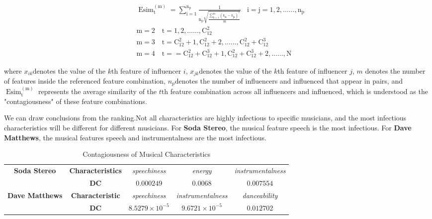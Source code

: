 \documentclass[12pt]{article}  %
\begin{document}
	\begin{equation}
		\begin{aligned}
			& \operatorname{Esim}_{\mathrm{t}}^{(\mathrm{m})}=\sum_{\mathrm{i}=1}^{\mathrm{n}_{\mathrm{p}}} \frac{1}{\mathrm{n}_{\mathrm{p}} \sqrt{\frac{\sum_{\mathrm{k}=1}^{\mathrm{m}}\left(\mathrm{x}_{\mathrm{ik}}-\mathrm{x}_{\mathrm{jk}}\right)^{2}}{\mathrm{~m}}}} 
			\mathrm{~~~~i}=\mathrm{j}=1,2, \ldots \ldots, \mathrm{n}_{\mathrm{p}} \\
			&\mathrm{m}=2 \quad \mathrm{t}=1,2, \ldots \ldots, \mathrm{C}_{12}^{2} \\
			&\mathrm{m}=3 \quad \mathrm{t}=\mathrm{C}_{12}^{2}+1, \mathrm{C}_{12}^{2}+2, \ldots \ldots, \mathrm{C}_{12}^{2}+\mathrm{C}_{12}^{3} \\
			&\mathrm{m}=4 \quad \mathrm{t}==\mathrm{C}_{12}^{2}+\mathrm{C}_{12}^{3}+1, \mathrm{C}_{12}^{2}+\mathrm{C}_{12}^{3}+2, \ldots \ldots, \mathrm{N}
		\end{aligned}
	\end{equation}
	
	where $ x_{ik} $denotes the value of the $ k $th feature of influencer $ i $, $ x_{jk} $denotes the value of the $ k $th feature of influencer $ j $, $ m $ denotes the number of features inside the referenced feature combination, $ n_p $denotes the number of influencers and influenced that appear in pairs, and $\operatorname{Esim}_{\mathrm{t}}^{(\mathrm{m})}$ represents the average similarity of the $ t $th feature combination across all influencers and influenced, which is understood as the "contagiousness" of these feature combinations.
	
	We can draw conclusions from the ranking.Not all characteristics are highly infectious to specific musicians, and the most infectious characteristics will be different for different musicians. For \textbf{Soda Stereo}, the musical feature speech is the most infectious. For \textbf{Dave Matthews}, the musical features speech and instrumentalness are the most infectious.
	
	\begin{table}[!htbp]
		\begin{center}
			\caption{Contagiousness of Musical Characteristics}
			\begin{tabular}{c|c|c|c|c}
				\toprule
				\midrule[1pt]
				\multirow{2}{*}{\textbf { Soda Stereo }} & \textbf { Characteristics } & \textit { speechiness } & \textit { energy } & \textit { instrumentalness } \\
				\cline { 2 - 5 } & \textbf{DC} & $ 0.000249 $ & $ 0.0068 $ & $ 0.007554 $ \\
				\hline \hline \multirow{2}{*}{\textbf { Dave Matthews }} & \textbf { Characteristic } & \textit { speechiness } & \textit { instrumentalness } & \textit { danceability } \\
				\cline { 2 - 5 } & \textbf{DC} & $ 8.5279 \times 10^{-5} $ & $ 9.6721 \times 10^{-5} $ & $ 0.012702 $ \\
				\midrule[1pt]
				\bottomrule
			\end{tabular}\label{tb:con}
		\end{center}
	\end{table}
	
\end{document}
